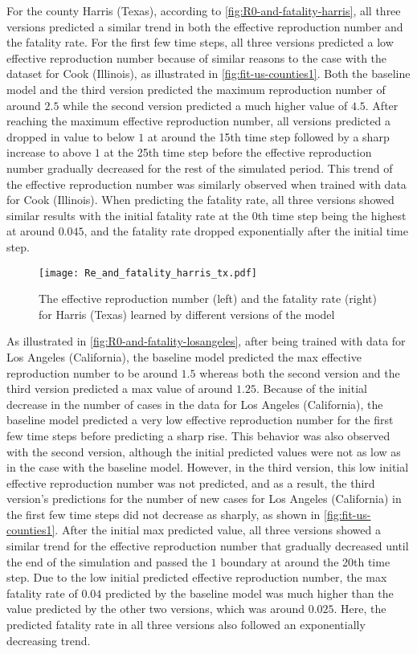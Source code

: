 For the county Harris (Texas), according to \autoref{fig:R0-and-fatality-harris}, all three versions predicted a similar trend in both the effective reproduction number and the fatality rate.
For the first few time steps, all three versions predicted a low effective reproduction number because of similar reasons to the case with the dataset for Cook (Illinois), as illustrated in \autoref{fig:fit-us-counties1}.
Both the baseline model and the third version predicted the maximum reproduction number of around $2.5$ while the second version predicted a much higher value of $4.5$.
After reaching the maximum effective reproduction number, all versions predicted a dropped in value to below $1$ at around the 15th time step followed by a sharp increase to above $1$ at the 25th time step before the effective reproduction number gradually decreased for the rest of the simulated period.
This trend of the effective reproduction number was similarly observed when trained with data for Cook (Illinois).
When predicting the fatality rate, all three versions showed similar results with the initial fatality rate at the 0th time step being the highest at around $0.045$, and the fatality rate dropped exponentially after the initial time step.

\begin{figure}[!htb]
    \centering
    \texttt{[image: Re\_and\_fatality\_harris\_tx.pdf]}
    \caption[Learnt effective reproduction number and fatality rate for Harris (Texas)]{The effective reproduction number (left) and the fatality rate (right) for Harris (Texas) learned by different versions of the model}
    \label{fig:R0-and-fatality-harris}
\end{figure}

As illustrated in \autoref{fig:R0-and-fatality-losangeles}, after being trained with data for Los Angeles (California), the baseline model predicted the max effective reproduction number to be around $1.5$ whereas both the second version and the third version predicted a max value of around $1.25$.
Because of the initial decrease in the number of cases in the data for Los Angeles (California), the baseline model predicted a very low effective reproduction number for the first few time steps before predicting a sharp rise.
This behavior was also observed with the second version, although the initial predicted values were not as low as in the case with the baseline model.
However, in the third version, this low initial effective reproduction number was not predicted, and as a result, the third version's predictions for the number of new cases for Los Angeles (California) in the first few time steps did not decrease as sharply, as shown in \autoref{fig:fit-us-counties1}.
After the initial max predicted value, all three versions showed a similar trend for the effective reproduction number that gradually decreased until the end of the simulation and passed the $1$ boundary at around the 20th time step.
Due to the low initial predicted effective reproduction number, the max fatality rate of $0.04$ predicted by the baseline model was much higher than the value predicted by the other two versions, which was around $0.025$.
Here, the predicted fatality rate in all three versions also followed an exponentially decreasing trend.

